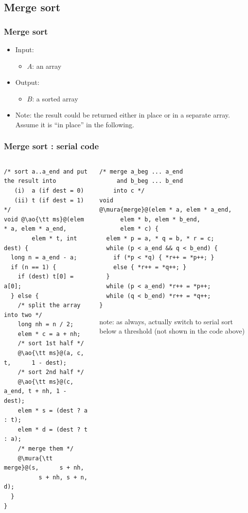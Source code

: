 \documentclass[12pt,dvipdfmx]{beamer}
\newcommand{\mura}[1]{{\color{purple}#1}}
\newcommand{\ao}[1]{{\color{blue}#1}}
\newcommand{\aka}[1]{{\color{red}#1}}
\begin{document}
\subsection{Merge sort}

\begin{frame}
\frametitle{Merge sort}
\begin{itemize}
\item Input: 
  \begin{itemize}
  \item \ao{$A$}: an array
  \end{itemize}
\item Output:
  \begin{itemize}
  \item \ao{$B$}: a sorted array
  \end{itemize}
\item Note: the result could be returned either in place
  or in a separate array. Assume it is ``in place'' in the following.
\end{itemize}
\end{frame}

\begin{frame}[fragile]
\frametitle{Merge sort : serial code}
\begin{columns}
\begin{column}{0.45\textwidth}
\begin{lstlisting}
/* sort a..a_end and put the result into
   (i)  a (if dest = 0)
   (ii) t (if dest = 1) */
void @\ao{\tt ms}@(elem * a, elem * a_end, 
        elem * t, int dest) {
  long n = a_end - a;
  if (n == 1) {
    if (dest) t[0] = a[0];
  } else {
    /* split the array into two */
    long nh = n / 2;
    elem * c = a + nh;
    /* sort 1st half */
    @\ao{\tt ms}@(a, c,     t,      1 - dest);
    /* sort 2nd half */
    @\ao{\tt ms}@(c, a_end, t + nh, 1 - dest);
    elem * s = (dest ? a : t);
    elem * d = (dest ? t : a);
    /* merge them */
    @\mura{\tt merge}@(s,      s + nh, 
          s + nh, s + n, d);
  }
}
\end{lstlisting}
\end{column}

\begin{column}{0.43\textwidth}
\begin{lstlisting}
/* merge a_beg ... a_end 
     and b_beg ... b_end 
    into c */
void 
@\mura{merge}@(elem * a, elem * a_end, 
      elem * b, elem * b_end, 
      elem * c) {
  elem * p = a, * q = b, * r = c;
  while (p < a_end && q < b_end) {
    if (*p < *q) { *r++ = *p++; }
    else { *r++ = *q++; }
  }
  while (p < a_end) *r++ = *p++;
  while (q < b_end) *r++ = *q++;
}
\end{lstlisting}

\aka{note:} as always, actually switch to serial sort below a threshold
  (not shown in the code above)
\end{column}
\end{columns}
\end{frame}
\end{document}
